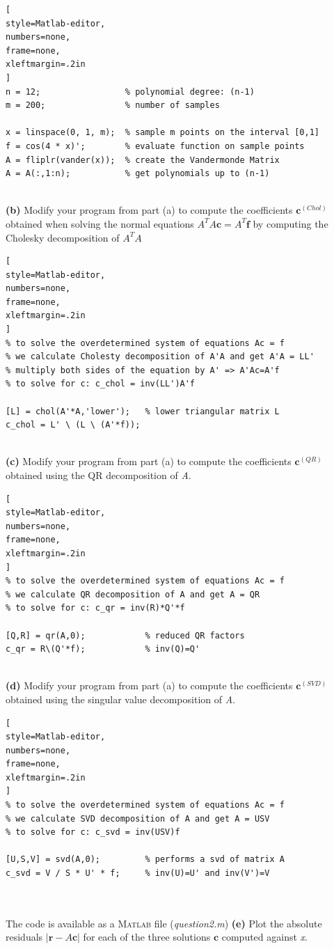 \documentclass[a4paper,11pt]{article}
\newcommand{\abs}[1]{\left\vert #1 \right\vert}
\begin{document}
\begin{lstlisting}[
style=Matlab-editor,
numbers=none,
frame=none,
xleftmargin=.2in
]
n = 12;                 % polynomial degree: (n-1)
m = 200;                % number of samples

x = linspace(0, 1, m);  % sample m points on the interval [0,1]
f = cos(4 * x)';        % evaluate function on sample points 
A = fliplr(vander(x));  % create the Vandermonde Matrix
A = A(:,1:n);           % get polynomials up to (n-1)
\end{lstlisting}
\noindent
\\\textbf{(b)} Modify your program from part (a) to compute the coefficients $\mathbf{c}^{(Chol)}$ obtained when solving the normal equations $A^TA\mathbf{c} = A^T\mathbf{f}$ by computing the Cholesky decomposition of $A^TA$

\begin{lstlisting}[
style=Matlab-editor,
numbers=none,
frame=none,
xleftmargin=.2in
]
% to solve the overdetermined system of equations Ac = f
% we calculate Cholesty decomposition of A'A and get A'A = LL'
% multiply both sides of the equation by A' => A'Ac=A'f 
% to solve for c: c_chol = inv(LL')A'f

[L] = chol(A'*A,'lower');   % lower triangular matrix L 
c_chol = L' \ (L \ (A'*f));
\end{lstlisting}

\noindent
\\\textbf{(c)} Modify your program from part (a) to compute the coefficients $\mathbf{c}^{(QR)}$ obtained using the QR decomposition of \textit{A}.

\begin{lstlisting}[
style=Matlab-editor,
numbers=none,
frame=none,
xleftmargin=.2in
]
% to solve the overdetermined system of equations Ac = f
% we calculate QR decomposition of A and get A = QR
% to solve for c: c_qr = inv(R)*Q'*f

[Q,R] = qr(A,0);            % reduced QR factors
c_qr = R\(Q'*f);            % inv(Q)=Q'
\end{lstlisting}

\noindent
\\\textbf{(d)} Modify your program from part (a) to compute the coefficients $\mathbf{c}^{(SVD)}$ obtained using the singular value decomposition of \textit{A}.

\begin{lstlisting}[
style=Matlab-editor,
numbers=none,
frame=none,
xleftmargin=.2in
]
% to solve the overdetermined system of equations Ac = f
% we calculate SVD decomposition of A and get A = USV
% to solve for c: c_svd = inv(USV)f

[U,S,V] = svd(A,0);         % performs a svd of matrix A
c_svd = V / S * U' * f;     % inv(U)=U' and inv(V')=V
\end{lstlisting}
\noindent
\\\\The code is available as a \textsc{Matlab} file (\textit{question2.m})
\newpage
\noindent
\textbf{(e)}  Plot the absolute residuals $\abs{\mathbf{r} - A\mathbf{c}}$ for each of the three solutions $\mathbf{c}$ computed against \textit{x}.
\end{document}
